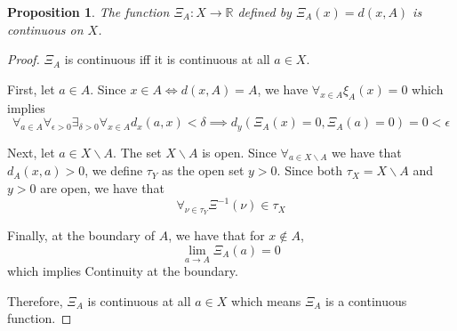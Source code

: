 \documentclass[]{article}
\newcommand{\R}{\mathbb{R}}
\newtheorem{proposition}{Proposition}
\begin{document}
\begin{proposition}
    The function $\Xi_A : X \to \R$ defined by $\Xi_A(x) = d(x,A)$ is continuous on $X$.
\end{proposition}
\begin{proof}
    $\Xi_A$ is continuous iff it is continuous at all $a \in X$.
    
    First, let $a \in A$.
    Since $x \in A \iff d(x,A) = A$, we have $\forall_{x \in A} \xi_A(x) = 0$ which implies \[
        \forall_{a \in A} \forall_{\epsilon>0} \exists_{\delta > 0} \forall_{x \in A} d_x(a,x) < \delta \implies d_y(\Xi_A(x) = 0,\Xi_A(a) = 0) = 0 < \epsilon
    \]

    Next, let $a \in X \backslash A$.
    The set $X \backslash A$ is open.
    Since $\forall_{a \in X \backslash A}$ we have that $d_A(x,a) > 0$, we define $\tau_Y$ as the open set $y > 0$.
    Since both $\tau_X = X \backslash A$ and $y>0$ are open, we have that \[
        \forall_{\nu \in \tau_Y} \Xi^{-1} (\nu) \in \tau_X
    \]

    Finally, at the boundary of $A$, we have that for $x \notin A$, \[
        \lim_{a \to A} \Xi_A(a) = 0
    \] which implies Continuity at the boundary.

    Therefore, $\Xi_A$ is continuous at all $a \in X$ which means $\Xi_A$ is a continuous function.
\end{proof}
\end{document}
